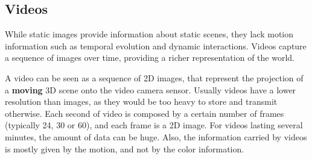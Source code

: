 \subsection{Videos}
While static images provide information about static scenes, they lack motion information such as temporal evolution and dynamic interactions.
Videos capture a sequence of images over time, providing a richer representation of the world.

A video can be seen as a sequence of 2D images, that represent the projection of a \textbf{moving} 3D scene onto the video camera sensor.
Usually videos have a lower resolution than images, as they would be too heavy to store and transmit otherwise. Each second of video is composed by a certain number of frames
(typically 24, 30 or 60), and each frame is a 2D image. For videos lasting several minutes, the amount of data can be huge.
Also, the information carried by videos is mostly given by the motion, and not by the color information.